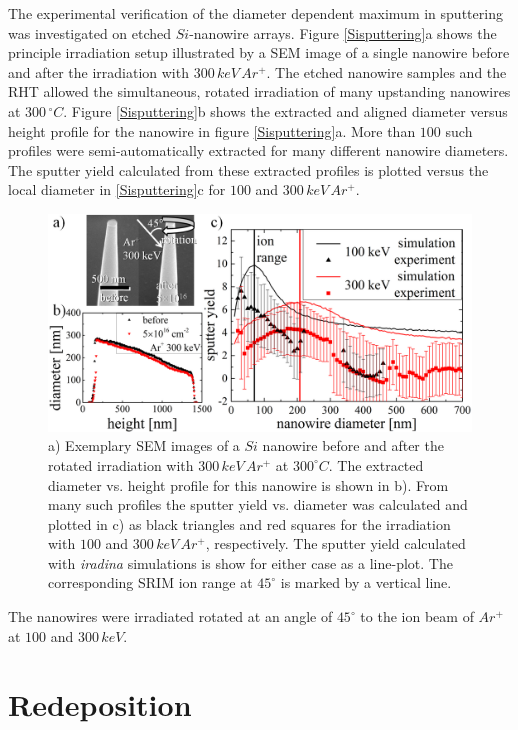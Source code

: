 The experimental verification of the diameter dependent maximum in sputtering was investigated on etched $Si$-nanowire arrays. Figure \ref{Sisputtering}a shows the principle irradiation setup illustrated by a SEM image of a single nanowire before and after the irradiation with $300\,keV\,Ar^+$. The etched nanowire samples and the RHT allowed the simultaneous, rotated irradiation of many upstanding nanowires at $300\,^\circ C$. Figure \ref{Sisputtering}b shows the extracted and aligned diameter versus height profile for the nanowire in figure \ref{Sisputtering}a. More than $100$ such profiles were semi-automatically extracted for many different nanowire diameters. The sputter yield calculated from these extracted profiles is plotted versus the local diameter in \ref{Sisputtering}c for $100$ and $300\,keV\,Ar^+$.

\begin{figure}[th]
	\centering
		\includegraphics[width=.95\textwidth]{images/sputter_exp.png}
	\caption{a) Exemplary SEM images of a $Si$ nanowire before and after the rotated irradiation with $300\,keV\,Ar^+$ at $300^\circ C$. The extracted diameter vs. height profile for this nanowire is shown in b). From many such profiles the sputter yield vs. diameter was calculated and plotted in c) as black triangles and red squares for the irradiation with $100$ and $300\,keV\,Ar^+$, respectively. The sputter yield calculated with \emph{iradina} simulations is show for either case as a line-plot. The corresponding SRIM ion range at $45^\circ$ is marked by a vertical line.} 
	\label{sputtering_exp}
\end{figure} 


The nanowires were irradiated rotated at an angle of $45^\circ$ to the ion beam of $Ar^+$ at $100$ and $300\,keV$.  




\section{Redeposition}
\label{sec:redeposition}

